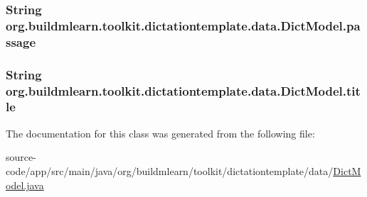 \subsubsection[{\texorpdfstring{passage}{passage}}]{\setlength{\rightskip}{0pt plus 5cm}String org.\+buildmlearn.\+toolkit.\+dictationtemplate.\+data.\+Dict\+Model.\+passage\hspace{0.3cm}{\ttfamily [private]}}\hypertarget{classorg_1_1buildmlearn_1_1toolkit_1_1dictationtemplate_1_1data_1_1DictModel_a93b0e1d530db77c590937a971d75697c}{}\label{classorg_1_1buildmlearn_1_1toolkit_1_1dictationtemplate_1_1data_1_1DictModel_a93b0e1d530db77c590937a971d75697c}
\subsubsection[{\texorpdfstring{title}{title}}]{\setlength{\rightskip}{0pt plus 5cm}String org.\+buildmlearn.\+toolkit.\+dictationtemplate.\+data.\+Dict\+Model.\+title\hspace{0.3cm}{\ttfamily [private]}}\hypertarget{classorg_1_1buildmlearn_1_1toolkit_1_1dictationtemplate_1_1data_1_1DictModel_a300553726072e08510965b54ece05b27}{}\label{classorg_1_1buildmlearn_1_1toolkit_1_1dictationtemplate_1_1data_1_1DictModel_a300553726072e08510965b54ece05b27}


The documentation for this class was generated from the following file\+:\begin{DoxyCompactItemize}
\item 
source-\/code/app/src/main/java/org/buildmlearn/toolkit/dictationtemplate/data/\hyperlink{DictModel_8java}{Dict\+Model.\+java}\end{DoxyCompactItemize}

